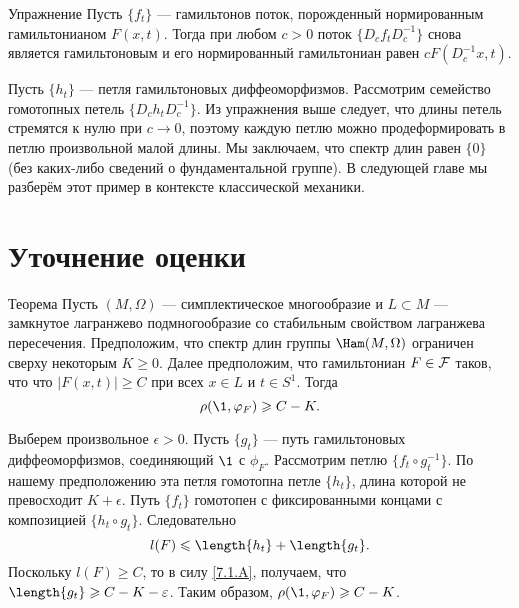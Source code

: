 \begin{thm*}{Упражнение}
Пусть $\{f_t\}$ --- гамильтонов поток, порожденный нормированным
гамильтонианом $F (x, t)$.
Тогда при любом $c> 0$ поток $\{D_c f_t D_c^{-1}\}$ снова является
гамильтоновым и его нормированный гамильтониан равен $cF (D_c^{-1} x, t)$.
\end{thm*}

Пусть $\{h_t\}$ --- петля гамильтоновых диффеоморфизмов.
Рассмотрим семейство гомотопных петель $\{D_c h_t D_c ^{-1}\}$.
Из упражнения выше следует, что длины петель стремятся к нулю при $c \to 0$, поэтому каждую петлю можно продеформировать в петлю произвольной малой длины.
Мы заключаем, что спектр длин равен $\{0\}$ (без каких-либо сведений о фундаментальной группе).
В следующей главе мы разберём этот пример в контексте классической механики.

\section{Уточнение оценки}

\begin{thm}{Теорема}\label{7.4.A}
Пусть $(M, \Omega)$ --- симплектическое многообразие и $L \subset M$ --- замкнутое лагранжево подмногообразие со стабильным  свойством лагранжева пересечения.
Предположим, что спектр длин группы $\Ham (M, \Omega)$ ограничен сверху некоторым $K \ge 0$.
Далее предположим, что гамильтониан $F \in \mathcal{F}$ таков, что что $| F (x, t) | \ge C$ при всех $x \in L$ и $t \in S^1$.
Тогда 
\[\rho (\1, \phi_F) \ge C - K.\]
\end{thm}

Выберем произвольное $\epsilon> 0$. 
Пусть $\{g_t\}$ --- путь гамильтоновых диффеоморфизмов, соединяющий $\1$ с $\phi_F$.
Рассмотрим петлю $\{f_t \circ g_t ^{-1}\}$.
По нашему предположению эта петля гомотопна петле $\{h_t\}$, длина которой не превосходит $K + \epsilon$.
Путь $\{f_t\}$ гомотопен с фиксированными концами с композицией $\{h_t \circ g_t\}$.
Следовательно
\[l (F) \le \length \{h_t\} + \length \{g_t\}.\]
Поскольку $l (F) \ge C$, то в силу \ref{7.1.A}, получаем, что $\length \{g_t\} \ge C \z- K - \epsilon$.
Таким образом, $\rho (\1, \phi_F) \ge C - K$.
\qeds

